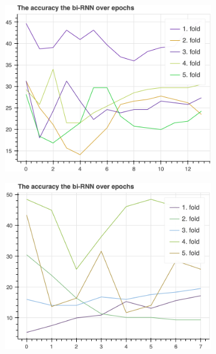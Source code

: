\begin{figure}[H]
\begin{subfigure}[b]{0.49\textwidth}
				\centering
				\includegraphics[width=\textwidth]{img/bi-RNN-accuracy.png}
			\end{subfigure}
			\begin{subfigure}[b]{0.49\textwidth}
				\centering
				\includegraphics[width=\textwidth]{img/bi-RNN-loss_values.png}
			\end{subfigure}
			\hfill
			\begin{subfigure}[b]{0.49\textwidth}
				\centering

\end{subfigure}
\end{figure}
